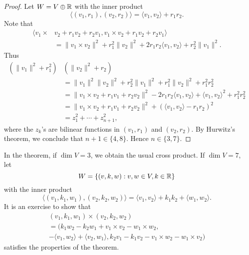 \begin{proof}
	Let $W=V\oplus\mathbb{R}$ with the inner product  
	\[
		\langle (v_1,r_1),(v_2,r_2)\rangle = \langle v_1,v_2\rangle+r_1r_2.
	\]
	Note that
	\begin{align*}
		\langle v_1\times &v_2+r_1v_2+r_2v_1,v_1\times v_2+r_1v_2+r_2v_1\rangle\\
		&=\|v_1\times v_2\|^2+r_1^2\|v_2\|^2+2r_1r_2\langle v_1,v_2\rangle+r_2^2\|v_1\|^2.
	\end{align*}
	Thus  
	\begin{align*}
		(\|v_1\|^2+r_1^2)&(\|v_2\|^2+r_2)\\
		&= \|v_1\|^2\|v_2\|^2+r_2^2\|v_1\|^2+r_1^2\|v_2\|^2+r_1^2r_2^2\\
		&=\|v_1\times v_2+r_1v_1+r_2v_2\|^2-2r_1r_2\langle v_1,v_2\rangle+\langle v_1,v_2\rangle^2+r_1^2r_2^2\\
		&=\|v_1\times v_2+r_1v_1+r_2v_2\|^2+(\langle v_1,v_2\rangle-r_1r_2)^2\\
		&=z_1^2+\cdots+z_{n+1}^2,
	\end{align*}
	where the $z_k$'s are bilinear functions in $(v_1,r_1)$ and $(v_2,r_2)$. 
	By Hurwitz's theorem, we conclude that 
	$n+1\in\{4,8\}$. Hence $n\in\{3,7\}$.
\end{proof}

In the theorem, if $\dim V=3$, we obtain the usual cross product. 
If $\dim V=7$, let 
\[
	W=\{(v,k,w):v,w\in V,k\in\mathbb{R}\}
\]
with the inner product 
\[
	\langle (v_1,k_1,w_1),(v_2,k_2,w_2)\rangle = \langle v_1,v_2\rangle+k_1k_2+\langle w_1,w_2\rangle.
\]
It is an exercise to show that 
\begin{multline*}
	(v_1,k_1,w_1)\times (v_2,k_2,w_2)\\
	=(k_1w_2-k_2w_1+v_1\times v_2-w_1\times w_2,
	\\-\langle v_1,w_2\rangle+\langle v_2,w_1\rangle, 
	k_2v_1-k_1v_2-v_1\times w_2-w_1\times v_2)
\end{multline*}
satisfies the properties of the theorem. 

